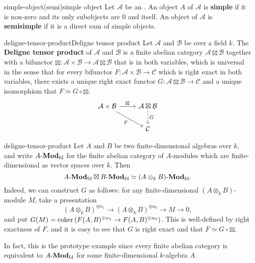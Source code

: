 \begin{topic}{simple-object}{(semi)simple object}
    Let $\mathcal{A}$ be an . An object $A$ of $\mathcal{A}$ is \textbf{simple} if it is non-zero and its only subobjects are $0$ and itself. An object of $\mathcal{A}$ is \textbf{semisimple} if it is a direct sum of simple objects.
\end{topic}

\begin{topic}{deligne-tensor-product}{Deligne tensor product}
    Let $\mathcal{A}$ and $\mathcal{B}$ be   over a field $k$. The \textbf{Deligne tensor product} of $\mathcal{A}$ and $\mathcal{B}$ is a finite abelian category $\mathcal{A} \boxtimes \mathcal{B}$ together with a bifunctor $\boxtimes : \mathcal{A} \times \mathcal{B} \to \mathcal{A} \boxtimes \mathcal{B}$ that is  in both variables, which is universal in the sense that for every bifunctor $F : \mathcal{A} \times \mathcal{B} \to \mathcal{C}$ which is right exact in both variables, there exists a unique right exact functor $G : \mathcal{A} \boxtimes \mathcal{B} \to \mathcal{C}$ and a unique  isomorphism that $F \simeq G \circ \boxtimes$.
    \[ \begin{tikzcd}
        \mathcal{A} \times \mathcal{B} \arrow{r}{\boxtimes} \arrow[swap]{dr}{F} & \mathcal{A} \boxtimes \mathcal{B} \arrow[dashed]{d}{G} \\
        & \mathcal{C}
    \end{tikzcd} \]
\end{topic}

\begin{example}{deligne-tensor-product}
    Let $A$ and $B$ be two finite-dimensional algebras over $k$, and write $A\textup{-}\textbf{Mod}_\textup{fd}$ for the finite abelian category of $A$-modules which are finite-dimensional as vector spaces over $k$. Then
    \[ A\textup{-}\textbf{Mod}_\textup{fd} \boxtimes B\textup{-}\textbf{Mod}_\textup{fd} \simeq (A \otimes_k B)\textup{-}\textbf{Mod}_\textup{fd} . \]
    Indeed, we can construct $G$ as follows: for any finite-dimensional $(A \otimes_k B)$-module $M$, take a presentation
    \[ (A \otimes_k B)^{\oplus n_1} \to (A \otimes_k B)^{\oplus n_0} \to M \to 0 , \]
    and put $G(M) = \operatorname{coker}\left( F(A, B)^{\oplus n_1} \to F(A, B)^{\oplus n_0} \right)$. This is well-defined by right exactness of $F$, and it is easy to see that $G$ is right exact and that $F \simeq G \circ \boxtimes$.
    
    In fact, this is the prototype example since every finite abelian category is equivalent to $A\textup{-}\textbf{Mod}_\textup{fd}$ for some finite-dimensional $k$-algebra $A$.
\end{example}

